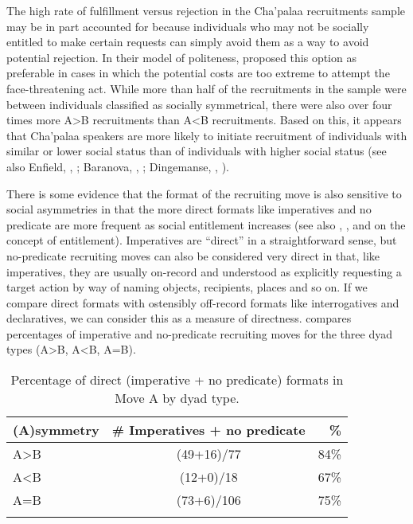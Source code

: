 \documentclass[output=paper]{langsci/langscibook}
\begin{document}
The high rate of fulfillment versus rejection in the Cha'palaa recruitments sample may be in part accounted for because individuals who may not be socially entitled to make certain requests can simply avoid them as a way to avoid potential rejection. In their model of politeness, \citet[69--74]{BrownLevinson1987} proposed this option as preferable in cases in which the potential costs are too extreme to attempt the face-threatening act. While more than half of the recruitments in the sample were between individuals classified as socially symmetrical, there were also over four times more A>B recruitments than A<B recruitments. Based on this, it appears that Cha'palaa speakers are more likely to initiate recruitment of individuals with similar or lower social status than of individuals with higher social status (see also Enfield, , ; Baranova, , ; Dingemanse, , ).

There is some evidence that the format of the recruiting move is also sensitive to social asymmetries in that the more direct formats like imperatives and no predicate are more frequent as social entitlement increases (see also \citealt{heinemann_will_2006}, \citealt{CurlDrew2008}, and \citealt{CravenPotter2010} on the concept of entitlement). Imperatives are “direct” in a straightforward sense, but no-predicate recruiting moves can also be considered very direct in that, like imperatives, they are usually on-record and understood as explicitly requesting a target action by way of naming objects, recipients, places and so on. If we compare direct formats with ostensibly off-record formats like interrogatives and declaratives, we can consider this as a measure of directness.  compares percentages of imperative and no-predicate recruiting moves for the three dyad types (A>B, A<B, A=B).

\begin{table}
\begin{tabularx}{0.75\textwidth}{Xcr}
\lsptoprule
(A)symmetry & \# Imperatives + no predicate & \% \\
\midrule
A>B & (49+16)/77 & 84\%\\
A<B & (12+0)/18 & 67\%\\
A=B & (73+6)/106 & 75\%\\
\lspbottomrule
\end{tabularx}
\caption{Percentage of direct (imperative + no predicate) formats in Move A by dyad type.}
\label{tab:floyd:7}
\end{table}
\end{document}
